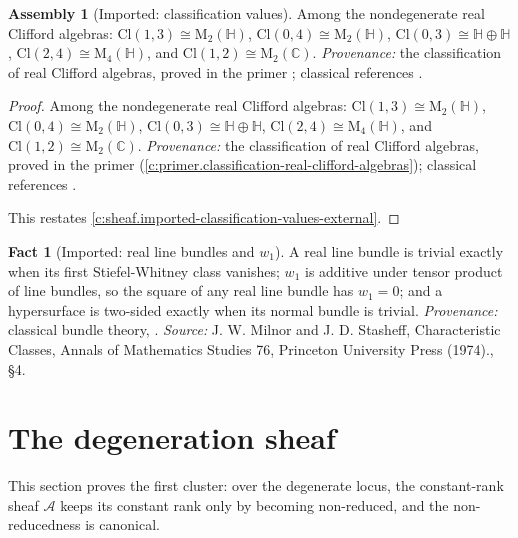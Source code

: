 \documentclass[11pt]{article}
\theoremstyle{definition}
\newtheorem{fact}[theorem]{Fact}
\newtheorem{assembled}[theorem]{Assembly}
\theoremstyle{plain}
\newcommand{\changedmark}[2]{\marginpar{\raggedright\scriptsize\color{#1}#2}}
\providecommand{\Cl}{}\renewcommand{\Cl}{\mathrm{Cl}}
\providecommand{\HH}{}\renewcommand{\HH}{\mathbb{H}}
\providecommand{\Mat}{}\renewcommand{\Mat}{\mathrm{M}}
\providecommand{\shA}{}\renewcommand{\shA}{\mathcal{A}}
\begin{document}
\begin{assembled}[Imported: classification values]\label{c:sheaf.imported-classification-values}
\changedmark{gray}{reworded}
Among the nondegenerate real Clifford algebras: $\Cl(1,3) \cong \Mat_2(\HH)$, $\Cl(0,4) \cong \Mat_2(\HH)$, $\Cl(0,3) \cong \HH \oplus \HH$, $\Cl(2,4) \cong \Mat_4(\HH)$, and $\Cl(1,2) \cong \Mat_2(\mathbb{C})$. \emph{Provenance:} the classification of real Clifford algebras, proved in the primer \cite[Thm.~9.3]{ButlerT0}; classical references \cite{Porteous1995, Lounesto2001}.
\end{assembled}
\begin{proof}
Among the nondegenerate real Clifford algebras: $\Cl(1,3) \cong \Mat_2(\HH)$, $\Cl(0,4) \cong \Mat_2(\HH)$, $\Cl(0,3) \cong \HH \oplus \HH$, $\Cl(2,4) \cong \Mat_4(\HH)$, and $\Cl(1,2) \cong \Mat_2(\mathbb{C})$. \emph{Provenance:} the classification of real Clifford algebras, proved in the primer \cite[Thm.~9.3]{ButlerT0} (\ref{c:primer.classification-real-clifford-algebras}); classical references \cite{Porteous1995, Lounesto2001}.

This restates \ref{c:sheaf.imported-classification-values-external}.

\end{proof}

\begin{fact}[Imported: real line bundles and $w_1$]\label{c:sheaf.imported-real-line-bundles}
A real line bundle is trivial exactly when its first Stiefel-Whitney class vanishes; $w_1$ is additive under tensor product of line bundles, so the square of any real line bundle has $w_1 = 0$; and a hypersurface is two-sided exactly when its normal bundle is trivial. \emph{Provenance:} classical bundle theory, \cite[\S 4]{MilnorStasheff1974}.
\emph{Source:} J. W. Milnor and J. D. Stasheff, Characteristic Classes, Annals of Mathematics Studies 76, Princeton University Press (1974)., \S 4.
\end{fact}

\section{The degeneration sheaf}

\label{c:note.sheaf.setting-degeneration-sheaf}
This section proves the first cluster: over the degenerate locus, the constant-rank sheaf $\shA$ keeps its constant rank only by becoming non-reduced, and the non-reducedness is canonical.
\end{document}
